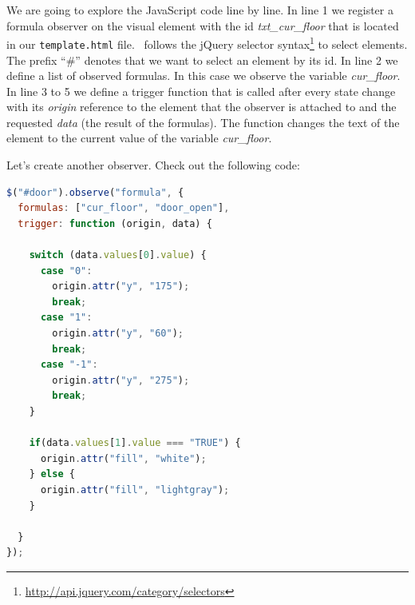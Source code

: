 We are going to explore the JavaScript code line by line.
In line 1 we register a formula observer on the visual element with the id \textit{txt\_cur\_floor} that is located in our \texttt{template.html} file.
\bms~follows the jQuery selector syntax\footnote{\url{http://api.jquery.com/category/selectors}} to select elements.
The prefix ``\#'' denotes that we want to select an element by its id.
In line 2 we define a list of observed formulas.
In this case we observe the variable \textit{cur\_floor}.
In line 3 to 5 we define a trigger function that is called after every state change with its \textit{origin} reference to the element that the observer is attached to and the requested \textit{data} (the result of the formulas).
The function changes the text of the element to the current value of the variable \textit{cur\_floor}.

Let's create another observer.
Check out the following code:

\begin{lstlisting}[language=JavaScript, caption={Formula Observer for the Lift Door (JavaScript)}]
$("#door").observe("formula", {
  formulas: ["cur_floor", "door_open"],
  trigger: function (origin, data) {
    
    switch (data.values[0].value) {
      case "0":
        origin.attr("y", "175");
        break;
      case "1":
        origin.attr("y", "60");
        break;
      case "-1":
        origin.attr("y", "275");
        break;
    }
    
    if(data.values[1].value === "TRUE") {
      origin.attr("fill", "white");
    } else {
      origin.attr("fill", "lightgray");
    }
    
  }
});
\end{lstlisting}

